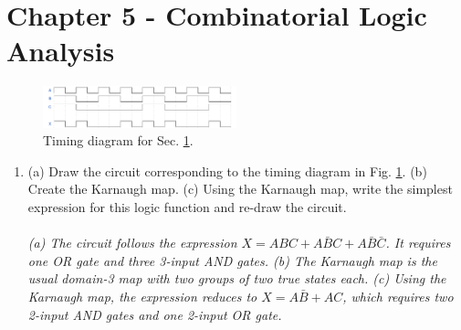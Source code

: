 \documentclass[10pt]{article}
\begin{document}
\section{Chapter 5 - Combinatorial Logic Analysis}
\label{sec:comb}
\begin{figure}[ht]
\centering
\includegraphics[width=0.5\textwidth]{timingExample3.pdf}
\caption{\label{fig:timing3} Timing diagram for Sec. \ref{sec:comb}.}
\end{figure}
\begin{enumerate}
\item (a) Draw the circuit corresponding to the timing diagram in Fig. \ref{fig:timing3}.  (b) Create the Karnaugh map.  (c) Using the Karnaugh map, write the simplest expression for this logic function and re-draw the circuit.\\ \\
\textit{(a) The circuit follows the expression $X = ABC + A\bar{B}C + A\bar{B}\bar{C}$.  It requires one OR gate and three 3-input AND gates.  (b) The Karnaugh map is the usual domain-3 map with two groups of two true states each.  (c) Using the Karnaugh map, the expression reduces to $X = A\bar{B} + AC$, which requires two 2-input AND gates and one 2-input OR gate.}
\end{enumerate}
\end{document}
